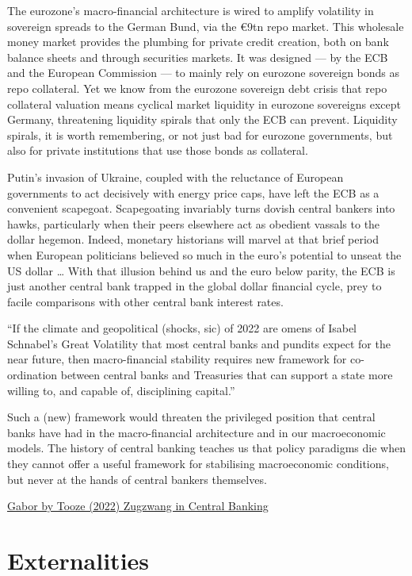 \documentclass[
]{book}
\begin{document}
The eurozone's macro-financial architecture is wired to amplify volatility in sovereign spreads to the German Bund, via the €9tn repo market. This wholesale money market provides the plumbing for private credit creation, both on bank balance sheets and through securities markets. It was designed --- by the ECB and the European Commission --- to mainly rely on eurozone sovereign bonds as repo collateral. Yet we know from the eurozone sovereign debt crisis that repo collateral valuation means cyclical market liquidity in eurozone sovereigns except Germany, threatening liquidity spirals that only the ECB can prevent. Liquidity spirals, it is worth remembering, or not just bad for eurozone governments, but also for private institutions that use those bonds as collateral.

Putin's invasion of Ukraine, coupled with the reluctance of European governments to act decisively with energy price caps, have left the ECB as a convenient scapegoat. Scapegoating invariably turns dovish central bankers into hawks, particularly when their peers elsewhere act as obedient vassals to the dollar hegemon. Indeed, monetary historians will marvel at that brief period when European politicians believed so much in the euro's potential to unseat the US dollar \ldots{} With that illusion behind us and the euro below parity, the ECB is just another central bank trapped in the global dollar financial cycle, prey to facile comparisons with other central bank interest rates.

``If the climate and geopolitical (shocks, sic) of 2022 are omens of Isabel Schnabel's Great Volatility that most central banks and pundits expect for the near future, then macro-financial stability requires new framework for co-ordination between central banks and Treasuries that can support a state more willing to, and capable of, disciplining capital.''

Such a (new) framework would threaten the privileged position that central banks have had in the macro-financial architecture and in our macroeconomic models. The history of central banking teaches us that policy paradigms die when they cannot offer a useful framework for stabilising macroeconomic conditions, but never at the hands of central bankers themselves.

\href{https://adamtooze.substack.com/p/chartbook-151-zugzwang-are-we-on}{Gabor by Tooze (2022) Zugzwang in Central Banking}

\hypertarget{externalities}{%
\chapter{Externalities}\label{externalities}}
\end{document}
